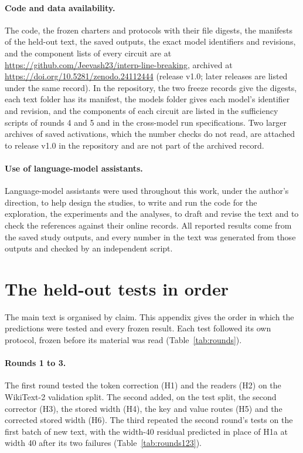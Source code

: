 \documentclass[11pt,a4paper]{article}
\begin{document}
\paragraph{Code and data availability.}
The code, the frozen charters and protocols with their file digests, the manifests of the held-out text, the saved outputs, the exact model identifiers and revisions, and the component lists of every circuit are at \url{https://github.com/Jeevash23/interp-line-breaking}, archived at \url{https://doi.org/10.5281/zenodo.24112444} (release v1.0; later releases are listed under the same record). In the repository, the two freeze records give the digests, each text folder has its manifest, the models folder gives each model's identifier and revision, and the components of each circuit are listed in the sufficiency scripts of rounds 4 and 5 and in the cross-model run specifications. Two larger archives of saved activations, which the number checks do not read, are attached to release v1.0 in the repository and are not part of the archived record.

\paragraph{Use of language-model assistants.}
Language-model assistants were used throughout this work, under the author's direction, to help design the studies, to write and run the code for the exploration, the experiments and the analyses, to draft and revise the text and to check the references against their online records. All reported results come from the saved study outputs, and every number in the text was generated from those outputs and checked by an independent script.




\appendix

\section{The held-out tests in order}
\label{app:rounds}

The main text is organised by claim. This appendix gives the order in which the predictions were tested and every frozen result. Each test followed its own protocol, frozen before its material was read (Table~\ref{tab:rounds}).

\paragraph{Rounds 1 to 3.} The first round tested the token correction (H1) and the readers (H2) on the WikiText-2 validation split. The second added, on the test split, the second corrector (H3), the stored width (H4), the key and value routes (H5) and the corrected stored width (H6). The third repeated the second round's tests on the first batch of new text, with the width-40 residual predicted in place of H1a at width 40 after its two failures (Table~\ref{tab:rounds123}).
\end{document}
